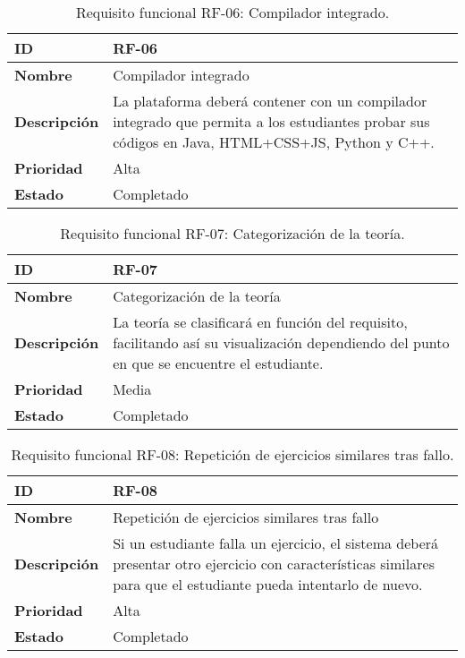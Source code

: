 \begin{table}[H]
    \centering
    \begin{tabular}{|l|p{9.5cm}|}
        \hline
        \textbf{ID} & RF-06 \\
        \hline
        \textbf{Nombre} & Compilador integrado \\
        \hline
        \textbf{Descripción} & La plataforma deberá contener con un compilador integrado que permita a los estudiantes probar sus códigos en Java, HTML+CSS+JS, Python y C++. \\
        \hline
        \textbf{Prioridad} & Alta \\
        \hline
        \textbf{Estado} & Completado \\
        \hline
    \end{tabular}
    \caption{Requisito funcional RF-06: Compilador integrado.}
    \label{table:req-RF007}
\end{table}

\begin{table}[H]
    \centering
    \begin{tabular}{|l|p{9.5cm}|}
        \hline
        \textbf{ID} & RF-07 \\
        \hline
        \textbf{Nombre} & Categorización de la teoría \\
        \hline
        \textbf{Descripción} & La teoría se clasificará en función del requisito, facilitando así su visualización dependiendo del punto en que se encuentre el estudiante. \\
        \hline
        \textbf{Prioridad} & Media \\
        \hline
        \textbf{Estado} & Completado \\
        \hline
    \end{tabular}
    \caption{Requisito funcional RF-07: Categorización de la teoría.}
    \label{table:req-RF008}
\end{table}

\begin{table}[H]
    \centering
    \begin{tabular}{|l|p{9.5cm}|}
        \hline
        \textbf{ID} & RF-08 \\
        \hline
        \textbf{Nombre} & Repetición de ejercicios similares tras fallo \\
        \hline
        \textbf{Descripción} & Si un estudiante falla un ejercicio, el sistema deberá presentar otro ejercicio con características similares para que el estudiante pueda intentarlo de nuevo. \\
        \hline
        \textbf{Prioridad} & Alta \\
        \hline
        \textbf{Estado} & Completado \\
        \hline
    \end{tabular}
    \caption{Requisito funcional RF-08: Repetición de ejercicios similares tras fallo.}
    \label{table:req-RF00X}
\end{table}

